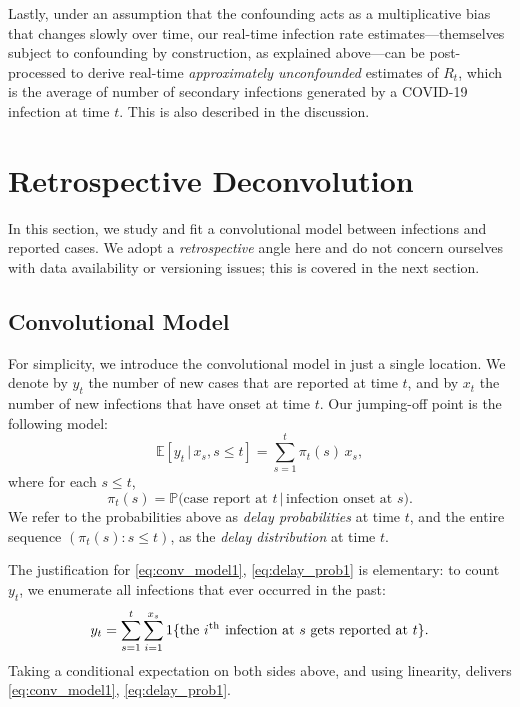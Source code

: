 \documentclass[sts]{imsart}
\def\E{\mathbb{E}}
\def\P{\mathbb{P}}
\def\th{^\mathrm{th}}
\theoremstyle{plain}
\theoremstyle{definition}
\theoremstyle{remark}
\begin{document}
Lastly, under an assumption that the confounding acts as a multiplicative bias
that changes slowly over time, our real-time infection rate
estimates---themselves subject to confounding by construction, as explained
above---can be post-processed to derive real-time \emph{approximately
unconfounded} estimates of $R_t$, which is the average of number of secondary
infections generated by a COVID-19 infection at time $t$. This is also described
in the discussion. 

\section{Retrospective Deconvolution}
\label{sec:deconv_retro}

In this section, we study and fit a convolutional model between infections and  
reported cases. We adopt a \emph{retrospective} angle here and do not concern
ourselves with data availability or versioning issues; this is covered in the
next section.   

\subsection{Convolutional Model}
\label{sec:conv_model}

For simplicity, we introduce the convolutional model in just a single
location. We denote by $y_t$ the number of new cases that are reported at time
$t$, and by $x_t$ the number of new infections that have onset at time $t$. Our
jumping-off point is the following model:
\begin{equation}
\label{eq:conv_model1}
\E[y_t \,|\, x_s, s \leq t] = \sum_{s=1}^t \pi_t(s) \, x_s, 
\end{equation}
where for each $s \leq t$,
\begin{equation}
\label{eq:delay_prob1}
\pi_t(s) = \P\big( \text{case report at $t$} \,|\, \text{infection onset at   
  $s$} \big). 
\end{equation}
We refer to the probabilities above as \emph{delay probabilities} at time $t$,
and the entire sequence $(\pi_t(s) : s \leq t)$, as the \emph{delay
  distribution} at time $t$. 

The justification for \eqref{eq:conv_model1}, \eqref{eq:delay_prob1} is
elementary: to count $y_t$, we enumerate all infections that ever occurred in
the past:  
\[
y_t = \sum_{s=1}^t \sum_{i=1}^{x_s} 1\{\text{the $i\th$ \hspace{-3pt} infection   
  at $s$ gets reported at $t$}\}.
\]
Taking a conditional expectation on both sides above, and using linearity,
delivers \eqref{eq:conv_model1}, \eqref{eq:delay_prob1}.
\end{document}
